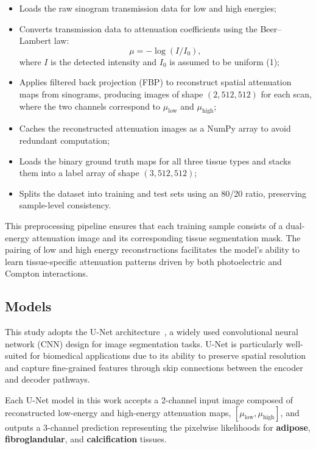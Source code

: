 \begin{itemize}
    \item Loads the raw sinogram transmission data for low and high energies;
    \item Converts transmission data to attenuation coefficients using the Beer–Lambert law:
    \[
        \mu = -\log(I / I_0),
    \]
    where $I$ is the detected intensity and $I_0$ is assumed to be uniform (1);
    \item Applies filtered back projection (FBP) to reconstruct spatial attenuation maps from sinograms, 
          producing images of shape $(2, 512, 512)$ for each scan, where the two channels correspond to 
          $\mu_{\text{low}}$ and $\mu_{\text{high}}$;
    \item Caches the reconstructed attenuation images as a NumPy array to avoid redundant computation;
    \item Loads the binary ground truth maps for all three tissue types and stacks them into a label array of shape $(3, 512, 512)$;
    \item Splits the dataset into training and test sets using an 80/20 ratio, preserving sample-level consistency.
\end{itemize}

This preprocessing pipeline ensures that each training sample consists of a dual-energy attenuation image and its 
corresponding tissue segmentation mask. The pairing of low and high energy reconstructions facilitates the model's 
ability to learn tissue-specific attenuation patterns driven by both photoelectric and Compton interactions.

\subsection{Models}

This study adopts the U-Net architecture~\cite{ronneberger2015unet}, a widely used convolutional neural network 
(CNN) design for image segmentation tasks. U-Net is particularly well-suited for biomedical applications due to 
its ability to preserve spatial resolution and capture fine-grained features through skip connections between the 
encoder and decoder pathways.

Each U-Net model in this work accepts a 2-channel input image composed of reconstructed low-energy and high-energy 
attenuation maps, \([\mu_{\text{low}}, \mu_{\text{high}}]\), and outputs a 3-channel prediction representing the 
pixelwise likelihoods for \textbf{adipose}, \textbf{fibroglandular}, and \textbf{calcification} tissues.

